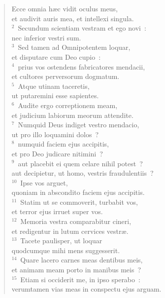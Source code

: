\begin{flushleft}\begin{verse}\vspace{-19pt}\hspace{6pt}Ecce omnia h\ae c vidit oculus meus,\\\hspace{6pt} et audivit auris mea, et intellexi singula.\\
${}^{2}$~Secundum scientiam vestram et ego novi~:\\ nec inferior vestri sum.\\
${}^{3}$~Sed tamen ad Omnipotentem loquar,\\ et disputare cum Deo cupio~:\\
${}^{4}$~prius vos ostendens fabricatores mendacii,\\ et cultores perversorum dogmatum.\\
${}^{5}$~Atque utinam taceretis,\\ ut putaremini esse sapientes.\\
${}^{6}$~Audite ergo correptionem meam,\\ et judicium labiorum meorum attendite.\\
${}^{7}$~Numquid Deus indiget vestro mendacio,\\ ut pro illo loquamini dolos~?\\
${}^{8}$~numquid faciem ejus accipitis,\\ et pro Deo judicare nitimini~?\\
${}^{9}$~aut placebit ei quem celare nihil potest~?\\ aut decipietur, ut homo, vestris fraudulentiis~?\\
${}^{10}$~Ipse vos arguet,\\ quoniam in abscondito faciem ejus accipitis.\\
${}^{11}$~Statim ut se commoverit, turbabit vos,\\ et terror ejus irruet super vos.\\
${}^{12}$~Memoria vestra comparabitur cineri,\\ et redigentur in lutum cervices vestr\ae .\\
${}^{13}$~Tacete paulisper, ut loquar\\ quodcumque mihi mens suggesserit.\\
${}^{14}$~Quare lacero carnes meas dentibus meis,\\ et animam meam porto in manibus meis~?\\
${}^{15}$~Etiam si occiderit me, in ipso sperabo~:\\ verumtamen vias meas in conspectu ejus arguam.\\

\end{verse}
\end{flushleft}
